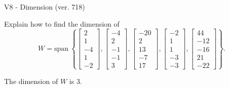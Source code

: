 \begin{exercise}
  \begin{exerciseTitle}V8 - Dimension (ver. 718)\end{exerciseTitle}
  \begin{exerciseStatement}
    Explain how to find the dimension of 
\[W=\mathrm{span}\ \left\{\left[\begin{array}{r}
2 \\
1 \\
-4 \\
1 \\
-2
\end{array}\right] , \left[\begin{array}{r}
-4 \\
2 \\
-1 \\
-1 \\
3
\end{array}\right] , \left[\begin{array}{r}
-20 \\
2 \\
13 \\
-7 \\
17
\end{array}\right] , \left[\begin{array}{r}
-2 \\
1 \\
1 \\
-3 \\
-3
\end{array}\right] , \left[\begin{array}{r}
44 \\
-12 \\
-16 \\
21 \\
-22
\end{array}\right]\right\}.\]



  \end{exerciseStatement}
  \begin{exerciseAnswer}
   The dimension of \(W\) is  \(3\).
  


  \end{exerciseAnswer}
\end{exercise}